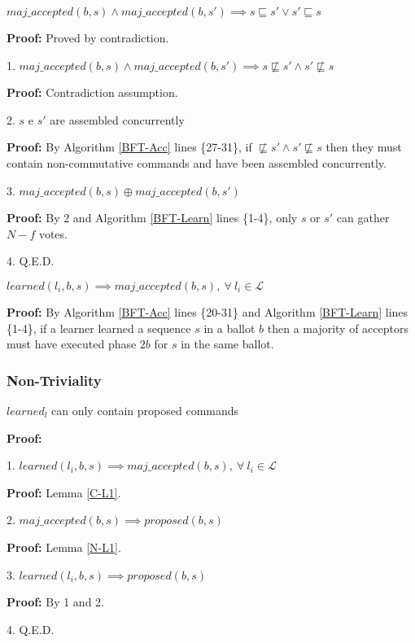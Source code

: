 \begin{lemma}
$maj\_accepted(b,s) \land maj\_accepted(b,s') \implies s \sqsubseteq s' \lor s' \sqsubseteq s$ \label{C-L3} \par
\end{lemma}
\textbf{Proof:} Proved by contradiction.\par
1. $maj\_accepted(b,s) \land maj\_accepted(b,s') \implies s \not\sqsubseteq s' \land s' \not\sqsubseteq s$ \par
\indent\indent\textbf{Proof:} Contradiction assumption.\par
2. $s$ e $s'$ are assembled concurrently \par
\indent\indent\textbf{Proof:} By Algorithm \ref{BFT-Acc} lines \{27-31\}, if $\not\sqsubseteq s' \land s' \not\sqsubseteq s$ then they must contain non-commutative commands and have been assembled concurrently. \par
3. $maj\_accepted(b,s) \oplus maj\_accepted(b,s')$ \par
\indent\indent\textbf{Proof:} By 2 and Algorithm \ref{BFT-Learn} lines \{1-4\}, only $s$ or $s'$ can gather $N-f$ votes.  \par
4. Q.E.D.

\begin{lemma}
$learned(l_i,b,s) \implies maj\_accepted(b,s),\ \forall\ l_i \in \mathcal{L}$ \label{C-L1} \par
\end{lemma} 
\textbf{Proof:} By Algorithm \ref{BFT-Acc} lines \{20-31\} and Algorithm \ref{BFT-Learn} lines \{1-4\}, if a learner learned a sequence $s$ in a ballot $b$ then a majority of acceptors must have executed phase $2b$ for $s$ in the same ballot.

\subsubsection{Non-Triviality}
\begin{theorem}
$learned_l$ can only contain proposed commands \label{N-T1} \par
\end{theorem} 
\textbf{Proof:} \par
1. $learned(l_i,b,s) \implies maj\_accepted(b,s),\ \forall\ l_i \in \mathcal{L}$ \par
\indent\indent\textbf{Proof:} Lemma \ref{C-L1}. \par
2. $maj\_accepted(b,s) \implies proposed(b,s)$ \par
\indent\indent\textbf{Proof:} Lemma \ref{N-L1}.\par
3. $learned(l_i,b,s) \implies proposed(b,s)$ \par
\indent\indent\textbf{Proof:} By 1 and 2. \par
4. Q.E.D. \par

